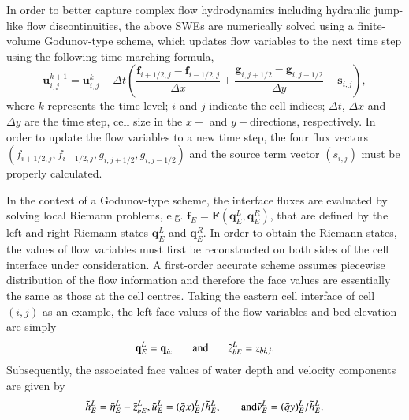 In order to better capture complex flow hydrodynamics including hydraulic jump-like flow discontinuities, the above SWEs are numerically solved using a finite-volume Godunov-type scheme, which updates flow variables to the next time step using the following time-marching formula,
\begin{equation}
	\label{SWE_1stO_Update}
	\textbf{u}_{i,j}^{k+1} 
	=
	\textbf{u}_{i,j}^{k}
	- \Delta t
	\left (
		\frac{\textbf{f}_{i+1/2, j} - \textbf{f}_{i-1/2, j}}{\Delta x}
		+
		\frac{\textbf{g}_{i, j+1/2} - \textbf{g}_{i, j-1/2}}{\Delta y}
		-
		\textbf{s}_{i,j}
	\right )
	,
\end{equation}
where $k$ represents the time level; $i$ and $j$ indicate the cell indices; $\Delta t$, $\Delta x$ and $\Delta y$ are the time step, cell size in the $x-$ and $y-$directions, respectively. In order to update the flow variables to a new time step, the four flux vectors $(f_{i+1/2, j}, f_{i-1/2, j}, g_{i, j+1/2}, g_{i, j-1/2})$ and the source term vector $(s_{i, j})$ must be properly calculated.

In the context of a Godunov-type scheme, the interface fluxes are evaluated by solving local Riemann problems, e.g. $\textbf{f}_E = \textbf{F}(\textbf{q}_E^L, \textbf{q}_E^R)$, that are defined by the left and right Riemann states $\textbf{q}_E^L$ and $\textbf{q}_E^R$. In order to obtain the Riemann states, the values of flow variables must first be reconstructed on both sides of the cell interface under consideration. A first-order accurate scheme assumes piecewise distribution of the flow information and therefore the face values are essentially the same as those at the cell centres. Taking the eastern cell interface of cell $(i, j)$ as an example, the left face values of the flow variables and bed elevation are simply
\begin{equation}
	\label{SWE_1stO_FaceValues}
	\textbf{q}_{E}^{L} = \textbf{q}_{ic}
	\hspace{4ex} \textrm{and} \hspace{4ex}
	\tilde{z}_{bE}^{L} = z_{b i,j}
	.
\end{equation}
Subsequently, the associated face values of water depth and velocity components are given by
\begin{equation}
	\label{SWE_1stO_FaceValues_huv}
	\tilde{h}_{E}^{L} = \tilde{\eta}_{E}^{L} - \tilde{z}_{bE}^{L}, \\
	\tilde{u}_{E}^{L} = (\tilde{q}x)_{E}^{L} / \tilde{h}_{E}^{L},
	\hspace{4ex} \textrm{and} \hspace{4ex}	\\
	\tilde{v}_{E}^{L} = (\tilde{q}y)_{E}^{L} / \tilde{h}_{E}^{L}
	.
\end{equation}

